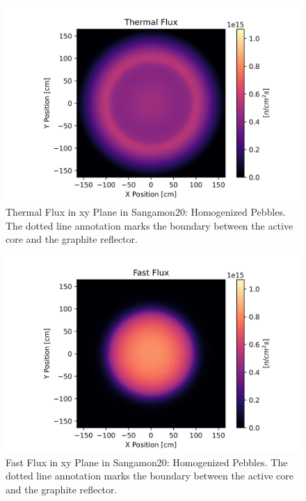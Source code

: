 \begin{figure}[H]
\centering

  \includegraphics[width=1.0\linewidth]{figures/therm_xy_plane_homog_v2.png}
  \caption{Thermal Flux in xy Plane in Sangamon20: Homogenized Pebbles.  The dotted line annotation marks the boundary between the active core and the graphite reflector.}
  \label{fig:hom-plane-therm}

\end{figure}


\begin{figure}[H]
\centering

 \includegraphics[width=1.0\linewidth]{figures/fast_xy_plane_homog_v2.png}
 \caption{Fast Flux in xy Plane in Sangamon20: Homogenized Pebbles.  The dotted line annotation marks the boundary between the active core and the graphite reflector.}
 \label{fig:hom-plane-fast}

\end{figure}